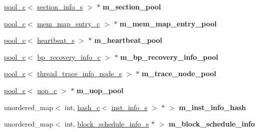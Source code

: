 \begin{DoxyCompactItemize}
\item 
\hypertarget{classmacsim__c_ae6961ebdcddb7f04c6f30c26206855af}{
\hyperlink{classpool__c}{pool\_\-c}$<$ \hyperlink{structsection__info__s}{section\_\-info\_\-s} $>$ $\ast$ {\bfseries m\_\-section\_\-pool}}
\label{classmacsim__c_ae6961ebdcddb7f04c6f30c26206855af}

\item 
\hypertarget{classmacsim__c_afda2ca57edf97e12c107dcea3d4c02cb}{
\hyperlink{classpool__c}{pool\_\-c}$<$ \hyperlink{classmem__map__entry__c}{mem\_\-map\_\-entry\_\-c} $>$ $\ast$ {\bfseries m\_\-mem\_\-map\_\-entry\_\-pool}}
\label{classmacsim__c_afda2ca57edf97e12c107dcea3d4c02cb}

\item 
\hypertarget{classmacsim__c_a65d74f24dbb74178906f184663282390}{
\hyperlink{classpool__c}{pool\_\-c}$<$ \hyperlink{classheartbeat__s}{heartbeat\_\-s} $>$ $\ast$ {\bfseries m\_\-heartbeat\_\-pool}}
\label{classmacsim__c_a65d74f24dbb74178906f184663282390}

\item 
\hypertarget{classmacsim__c_aa6275ca9790f25e3532b066b1a24f3d2}{
\hyperlink{classpool__c}{pool\_\-c}$<$ \hyperlink{classbp__recovery__info__c}{bp\_\-recovery\_\-info\_\-c} $>$ $\ast$ {\bfseries m\_\-bp\_\-recovery\_\-info\_\-pool}}
\label{classmacsim__c_aa6275ca9790f25e3532b066b1a24f3d2}

\item 
\hypertarget{classmacsim__c_ab5544e875d5e35378fa6496ede6459c7}{
\hyperlink{classpool__c}{pool\_\-c}$<$ \hyperlink{structthread__trace__info__node__s}{thread\_\-trace\_\-info\_\-node\_\-s} $>$ $\ast$ {\bfseries m\_\-trace\_\-node\_\-pool}}
\label{classmacsim__c_ab5544e875d5e35378fa6496ede6459c7}

\item 
\hypertarget{classmacsim__c_a781123061f8045a8d85f744bd0ccd07c}{
\hyperlink{classpool__c}{pool\_\-c}$<$ \hyperlink{classuop__c}{uop\_\-c} $>$ $\ast$ {\bfseries m\_\-uop\_\-pool}}
\label{classmacsim__c_a781123061f8045a8d85f744bd0ccd07c}

\item 
\hypertarget{classmacsim__c_afe2d09324626df7fb2d3fe8d8e04b404}{
unordered\_\-map$<$ int, \hyperlink{classhash__c}{hash\_\-c}$<$ \hyperlink{classinst__info__s}{inst\_\-info\_\-s} $>$ $\ast$ $>$ {\bfseries m\_\-inst\_\-info\_\-hash}}
\label{classmacsim__c_afe2d09324626df7fb2d3fe8d8e04b404}

\item 
\hypertarget{classmacsim__c_a097596db621a77dc4b8854e7ba13d944}{
unordered\_\-map$<$ int, \hyperlink{structblock__schedule__info__s}{block\_\-schedule\_\-info\_\-s} $\ast$ $>$ {\bfseries m\_\-block\_\-schedule\_\-info}}
\label{classmacsim__c_a097596db621a77dc4b8854e7ba13d944}


\end{DoxyCompactItemize}
